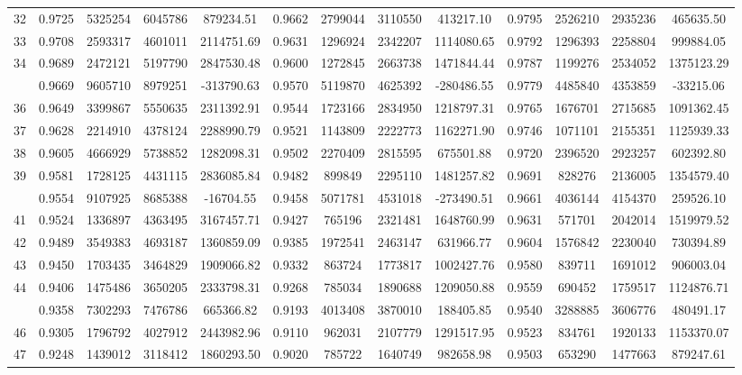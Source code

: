 \documentclass[
  12pt,
]{article}
\begin{document}
\begin{longtable}[t]{lcccccccccccc}
32 & 0.9725 & 5325254 & 6045786 & 879234.51 & 0.9662 & 2799044 & 3110550 & 413217.10 & 0.9795 & 2526210 & 2935236 & 465635.50\\
33 & 0.9708 & 2593317 & 4601011 & 2114751.69 & 0.9631 & 1296924 & 2342207 & 1114080.65 & 0.9792 & 1296393 & 2258804 & 999884.05\\
34 & 0.9689 & 2472121 & 5197790 & 2847530.48 & 0.9600 & 1272845 & 2663738 & 1471844.44 & 0.9787 & 1199276 & 2534052 & 1375123.29\\
\addlinespace
35 & 0.9669 & 9605710 & 8979251 & -313790.63 & 0.9570 & 5119870 & 4625392 & -280486.55 & 0.9779 & 4485840 & 4353859 & -33215.06\\
36 & 0.9649 & 3399867 & 5550635 & 2311392.91 & 0.9544 & 1723166 & 2834950 & 1218797.31 & 0.9765 & 1676701 & 2715685 & 1091362.45\\
37 & 0.9628 & 2214910 & 4378124 & 2288990.79 & 0.9521 & 1143809 & 2222773 & 1162271.90 & 0.9746 & 1071101 & 2155351 & 1125939.33\\
38 & 0.9605 & 4666929 & 5738852 & 1282098.31 & 0.9502 & 2270409 & 2815595 & 675501.88 & 0.9720 & 2396520 & 2923257 & 602392.80\\
39 & 0.9581 & 1728125 & 4431115 & 2836085.84 & 0.9482 & 899849 & 2295110 & 1481257.82 & 0.9691 & 828276 & 2136005 & 1354579.40\\
\addlinespace
40 & 0.9554 & 9107925 & 8685388 & -16704.55 & 0.9458 & 5071781 & 4531018 & -273490.51 & 0.9661 & 4036144 & 4154370 & 259526.10\\
41 & 0.9524 & 1336897 & 4363495 & 3167457.71 & 0.9427 & 765196 & 2321481 & 1648760.99 & 0.9631 & 571701 & 2042014 & 1519979.52\\
42 & 0.9489 & 3549383 & 4693187 & 1360859.09 & 0.9385 & 1972541 & 2463147 & 631966.77 & 0.9604 & 1576842 & 2230040 & 730394.89\\
43 & 0.9450 & 1703435 & 3464829 & 1909066.82 & 0.9332 & 863724 & 1773817 & 1002427.76 & 0.9580 & 839711 & 1691012 & 906003.04\\
44 & 0.9406 & 1475486 & 3650205 & 2333798.31 & 0.9268 & 785034 & 1890688 & 1209050.88 & 0.9559 & 690452 & 1759517 & 1124876.71\\
\addlinespace
45 & 0.9358 & 7302293 & 7476786 & 665366.82 & 0.9193 & 4013408 & 3870010 & 188405.85 & 0.9540 & 3288885 & 3606776 & 480491.17\\
46 & 0.9305 & 1796792 & 4027912 & 2443982.96 & 0.9110 & 962031 & 2107779 & 1291517.95 & 0.9523 & 834761 & 1920133 & 1153370.07\\
47 & 0.9248 & 1439012 & 3118412 & 1860293.50 & 0.9020 & 785722 & 1640749 & 982658.98 & 0.9503 & 653290 & 1477663 & 879247.61\\

\end{longtable}
\end{document}
